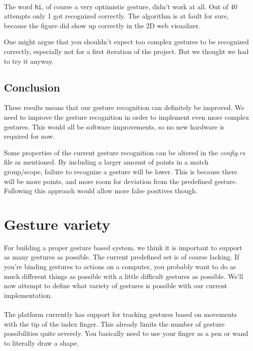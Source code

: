 \documentclass[a4paper]{article}
\begin{document}
  \paragraph{}
  The word \verb_hi_, of course a very optimistic gesture, didn't work at all.
  Out of 40 attempts only 1 got recognized correctly. The algorithm is at fault
  for sure, because the figure did show up correctly in the 2D web visualizer.

  One might argue that you shouldn't expect too complex gestures to be
  recognized correctly, especially not for a first iteration of the project. But
  we thought we had to try it anyway.

  \subsection*{Conclusion}
  These results means that our gesture recognition can definitely be improved.
  We need to improve the gesture recognition in order to implement even more
  complex gestures. This would all be software improvements, so no new hardware
  is required for now.

  Some properties of the current gesture recognition can be altered in the
  \textit{config.rs} file as mentioned. By including a larger amount of points
  in a match group/scope, failure to recognize a gesture will be lower.
  This is because there will be more points, and more room for deviation from
  the predefined gesture. Following this approach would allow more false positives though.

  \clearpage

  \section*{Gesture variety}
  For building a proper gesture based system, we think it is important to
  support as many gestures as possible. The current predefined set is of course
  lacking. If you're binding gestures to actions on
  a computer, you probably want to do as much different things as possible with
  a little difficult gestures as possible. We'll now attempt to define what
  variety of gestures is possible with our current implementation.

  \paragraph{}
  The platform currently has support for tracking gestures based on movements
  with the tip of the index finger. This already limits the number of gesture
  possibilities quite severely. You basically need to use your finger as a pen
  or wand to literally draw a shape.
\end{document}
